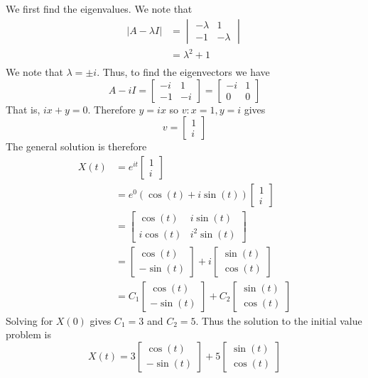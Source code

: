 \documentclass[11pt]{article}
\theoremstyle{plain} %
\theoremstyle{definition}
\theoremstyle{example}
\theoremstyle{remark}
\begin{document}
We first find the eigenvalues. We note that 
\begin{align*}
|A-\lambda I| &= \begin{vmatrix}-\lambda & 1 \\ -1 & -\lambda\end{vmatrix}\\
&= \lambda^2 + 1 \\
\end{align*}
We note that $\lambda = \pm i$. Thus, to find the eigenvectors we have $$A-iI = \begin{bmatrix}-i & 1 \\-1 & -i\end{bmatrix}= \begin{bmatrix}-i & 1 \\0 & 0\end{bmatrix}$$ That is, $ix + y = 0$. Therefore $y = ix$ so $v:x=1, y = i$ gives $$v = \begin{bmatrix}1\\i\end{bmatrix}$$
The general solution is therefore 
\begin{align*}
X(t) &= e^{it}\begin{bmatrix}1 \\ i\end{bmatrix}\\
&= e^0(\cos(t) + i\sin(t))\begin{bmatrix}1 \\ i\end{bmatrix}\\
&= \begin{bmatrix}\cos(t) & i\sin(t) \\
i\cos(t) & i^2\sin(t)\end{bmatrix} \\
&= \begin{bmatrix}\cos(t) \\ -\sin(t) \end{bmatrix} + i \begin{bmatrix}\sin(t) \\ \cos(t) \end{bmatrix}\\
&= C_1\begin{bmatrix}\cos(t) \\ -\sin(t) \end{bmatrix} + C_2 \begin{bmatrix}\sin(t) \\ \cos(t) \end{bmatrix}
\end{align*}
Solving for $X(0)$ gives $C_1=3$ and  $C_2=5$. Thus the solution to the initial value problem is 
$$X(t) = 3\begin{bmatrix}\cos(t) \\ -\sin(t) \end{bmatrix} + 5 \begin{bmatrix}\sin(t) \\ \cos(t) \end{bmatrix}$$
\end{document}
